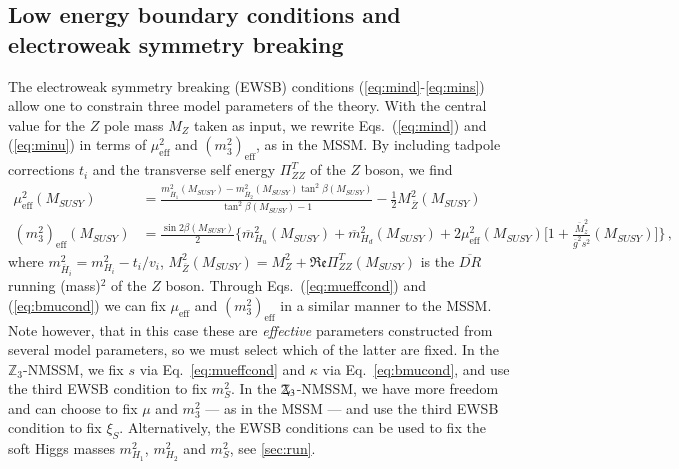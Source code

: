 \documentclass[final,3p,times,pdflatex]{elsarticle}
\newcommand{\Zv}{\,\mathbf{\backslash}\mkern-11.0mu{\mathbb{Z}}_{3}} %
\begin{document}
\subsection{Low energy boundary conditions and electroweak 
symmetry breaking \label{ewsb}} 
The electroweak symmetry breaking (EWSB) conditions (\ref{eq:mind}-\ref{eq:mins}) 
allow one to constrain three model parameters of the theory.  With the central value 
for the $Z$ pole mass $M_Z$ taken as input, we rewrite Eqs.~(\ref{eq:mind}) and 
(\ref{eq:minu}) in terms of $\mu_\textrm{eff}^2$ and $(m_3^2)_\textrm{eff}$, as in 
the MSSM.  By including tadpole corrections $t_i$ and the transverse self energy $\Pi^T_{ZZ}$ of the 
$Z$ boson, we find
%
\begin{align}
  \mu_\textrm{eff}^2(M_{SUSY}) &=
  \frac{m_{\overline{H}_1}^2(M_{SUSY}) -
    m_{\overline{H}_2}^2(M_{SUSY}) \tan^2 \beta(M_{SUSY})}{\tan^2
    \beta(M_{SUSY}) - 1} - \frac{1}{2} M_{\overline Z}^2
  (M_{SUSY})\label{eq:mueffcond}\\ 
%
  (m^2_3)_\textrm{eff}(M_{SUSY})&=\frac{\sin{2\beta}(M_{SUSY})}{2}\Bigg\{\overline{m}_{H_u}^2(M_{SUSY})+\overline{m}_{H_d}^2(M_{SUSY})+
  2\mu_\textrm{eff}^2(M_{SUSY})\Bigg[1+\frac{\overline{M}_z^2}{\overline{g}^2s^2}(M_{SUSY})\Bigg]\Bigg\}\,,
  \label{eq:bmucond}
\end{align} 
% 
where 
$m_{\overline{H}_i}^2 = m_{H_i}^2 - t_i/v_i$, 
$M_{\overline Z}^2(M_{SUSY}) = M_Z^2 + \Re\mathfrak{e}\Pi_{ZZ}^T(M_{SUSY})$ is the 
$\overline{DR}$ running (mass)$^2$ of the $Z$ boson.  Through Eqs.~(\ref{eq:mueffcond}) and (\ref{eq:bmucond}) we
can fix $\mu_\textrm{eff}$ and $(m^2_3)_\textrm{eff}$ in a similar manner
to the MSSM.  Note however, that in this case these are {\it effective} 
parameters constructed from several model parameters, so we must select which
of the latter are fixed.
In the $\mathbb{Z}_3$-NMSSM, we fix $s$ via Eq.~\ref{eq:mueffcond} and $\kappa$
via Eq.~\ref{eq:bmucond}, and use the third EWSB condition to fix
$m_S^2$.  In the $\Zv$-NMSSM, we have more freedom and can choose to fix
$\mu$ and $m_3^2$ --- as in the MSSM --- and use the third EWSB
condition to fix $\xi_S$.
Alternatively, the EWSB conditions can be used to fix the soft Higgs
masses $m_{H_1}^2$, $m_{H_2}^2$ and $m_S^2$, see
\ref{sec:run}.
\end{document}
